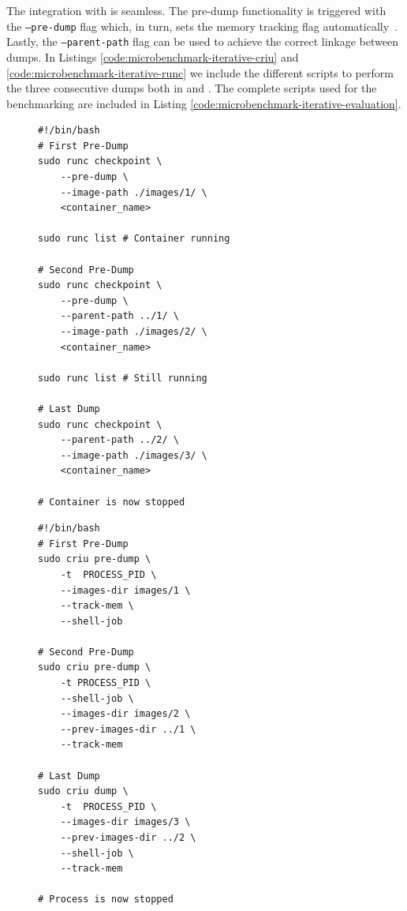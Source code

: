 The integration with \runc is seamless.
The pre-dump functionality is triggered with the \texttt{--pre-dump} flag which, in turn, sets the memory tracking flag automatically~\cite{runc-memtrack}.
Lastly, the \texttt{--parent-path} flag can be used to achieve the correct linkage between dumps.
In Listings \ref{code:microbenchmark-iterative-criu} and \ref{code:microbenchmark-iterative-runc} we include the different scripts to perform the three consecutive dumps both in \criu and \runc.
The complete scripts used for the benchmarking are included in Listing \ref{code:microbenchmark-iterative-evaluation}.
\begin{figure}[h!]
\begin{minipage}{.45\textwidth}
\begin{lstlisting}[style=Bash,caption={Scripts to perform two pre-dumps and a dump of a running process using CRIU.\label{code:microbenchmark-iterative-runc}}]
#!/bin/bash
# First Pre-Dump
sudo runc checkpoint \
    --pre-dump \
    --image-path ./images/1/ \
    <container_name>

sudo runc list # Container running

# Second Pre-Dump
sudo runc checkpoint \
    --pre-dump \
    --parent-path ../1/ \
    --image-path ./images/2/ \
    <container_name>

sudo runc list # Still running

# Last Dump
sudo runc checkpoint \
    --parent-path ../2/ \
    --image-path ./images/3/ \
    <container_name>

# Container is now stopped
\end{lstlisting}
\end{minipage}\hfill
\begin{minipage}{.45\textwidth}
\begin{lstlisting}[style=Bash,caption={Scripts to perform two pre-dumps and a dump of a running container using runC.\label{code:microbenchmark-iterative-criu}}]
#!/bin/bash
# First Pre-Dump
sudo criu pre-dump \
    -t  PROCESS_PID \
    --images-dir images/1 \
    --track-mem \
    --shell-job 

# Second Pre-Dump
sudo criu pre-dump \
    -t PROCESS_PID \
    --shell-job \
    --images-dir images/2 \
    --prev-images-dir ../1 \
    --track-mem

# Last Dump
sudo criu dump \
    -t  PROCESS_PID \
    --images-dir images/3 \
    --prev-images-dir ../2 \
    --shell-job \
    --track-mem

# Process is now stopped
\end{lstlisting}
\end{minipage}
\end{figure}


